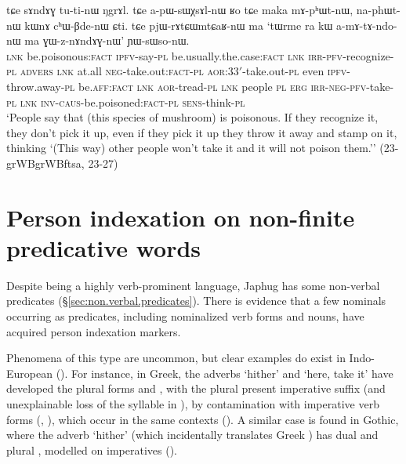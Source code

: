\begin{exe}
\ex \label{ex:amAtAndonW.ma.GWznAndAGnW}
\gll tɕe sɤndɤɣ tu-ti-nɯ ŋgrɤl. tɕe a-pɯ-sɯχsɤl-nɯ ʁo tɕe maka mɤ-pʰɯt-nɯ, na-phɯt-nɯ kɯnɤ cʰɯ-βde-nɯ ɕti. tɕe pjɯ-rɤtɕɯmtɕaʁ-nɯ ma `tɯrme ra kɯ a-mɤ-tɤ-ndo-nɯ ma ɣɯ-z-nɤndɤɣ-nɯ' ɲɯ-sɯso-nɯ. \\
\textsc{lnk} be.poisonous:\textsc{fact} \textsc{ipfv}-say-\textsc{pl} be.usually.the.case:\textsc{fact} \textsc{lnk} \textsc{irr}-\textsc{pfv}-recognize-\textsc{pl} \textsc{advers} \textsc{lnk} at.all \textsc{neg}-take.out:\textsc{fact}-\textsc{pl} \textsc{aor}:3\fl{}3$'$-take.out-\textsc{pl} even \textsc{ipfv}-throw.away-\textsc{pl} be.\textsc{aff}:\textsc{fact} \textsc{lnk} \textsc{aor}-tread-\textsc{pl} \textsc{lnk} people \textsc{pl} \textsc{erg} \textsc{irr}-\textsc{neg}-\textsc{pfv}-take-\textsc{pl} \textsc{lnk} \textsc{inv}-\textsc{caus}-be.poisoned:\textsc{fact}-\textsc{pl} \textsc{sens}-think-\textsc{pl} \\
\glt `People say that (this species of mushroom) is poisonous. If they recognize it, they don't pick it up, even if they pick it up they throw it away and stamp on it, thinking `(This way) other people won't take it and it will not poison them.'' (23-grWBgrWBftsa, 23-27)
\end{exe}

\section{Person indexation on non-finite predicative words} \label{sec:non.finite.indexation}
Despite being a highly verb-prominent language, Japhug has some non-verbal predicates (§\ref{sec:non.verbal.predicates}). There is evidence that a few nominals occurring as predicates, including nominalized verb forms and nouns, have acquired person indexation markers.

Phenomena of this type are uncommon, but clear examples do exist in Indo-European (\citealt[414]{pott1859}). For instance, in Greek, the adverbs  `hither' and  `here, take it' have developed the plural forms  and , with the plural present imperative suffix  (and unexplainable loss of the syllable  in ), by contamination with imperative verb forms (, ), which occur in the same contexts (\citealt[113--114]{viti15wandel}).  A similar case is found in Gothic, where the adverb  `hither' (which incidentally translates Greek ) has dual  and plural , modelled on imperatives (\citealt[104]{braune53gotische}).

